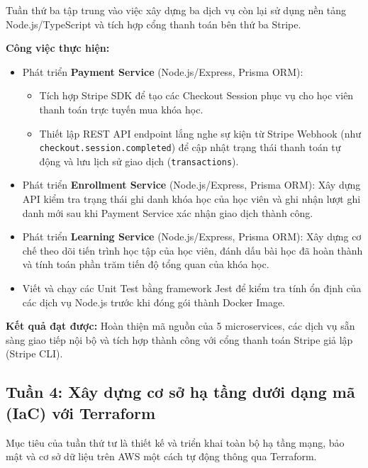 Tuần thứ ba tập trung vào việc xây dựng ba dịch vụ còn lại sử dụng nền tảng Node.js/TypeScript và tích hợp cổng thanh toán bên thứ ba Stripe.

\textbf{Công việc thực hiện:}
\begin{itemize}
    \item Phát triển \textbf{Payment Service} (Node.js/Express, Prisma ORM):
    \begin{itemize}
        \item Tích hợp Stripe SDK để tạo các Checkout Session phục vụ cho học viên thanh toán trực tuyến mua khóa học.
        \item Thiết lập REST API endpoint lắng nghe sự kiện từ Stripe Webhook (như \texttt{checkout.session.completed}) để cập nhật trạng thái thanh toán tự động và lưu lịch sử giao dịch (\texttt{transactions}).
    \end{itemize}
    \item Phát triển \textbf{Enrollment Service} (Node.js/Express, Prisma ORM): Xây dựng API kiểm tra trạng thái ghi danh khóa học của học viên và ghi nhận lượt ghi danh mới sau khi Payment Service xác nhận giao dịch thành công.
    \item Phát triển \textbf{Learning Service} (Node.js/Express, Prisma ORM): Xây dựng cơ chế theo dõi tiến trình học tập của học viên, đánh dấu bài học đã hoàn thành và tính toán phần trăm tiến độ tổng quan của khóa học.
    \item Viết và chạy các Unit Test bằng framework Jest để kiểm tra tính ổn định của các dịch vụ Node.js trước khi đóng gói thành Docker Image.
\end{itemize}

\textbf{Kết quả đạt được:} Hoàn thiện mã nguồn của 5 microservices, các dịch vụ sẵn sàng giao tiếp nội bộ và tích hợp thành công với cổng thanh toán Stripe giả lập (Stripe CLI).

\subsection{Tuần 4: Xây dựng cơ sở hạ tầng dưới dạng mã (IaC) với Terraform}

Mục tiêu của tuần thứ tư là thiết kế và triển khai toàn bộ hạ tầng mạng, bảo mật và cơ sở dữ liệu trên AWS một cách tự động thông qua Terraform.

